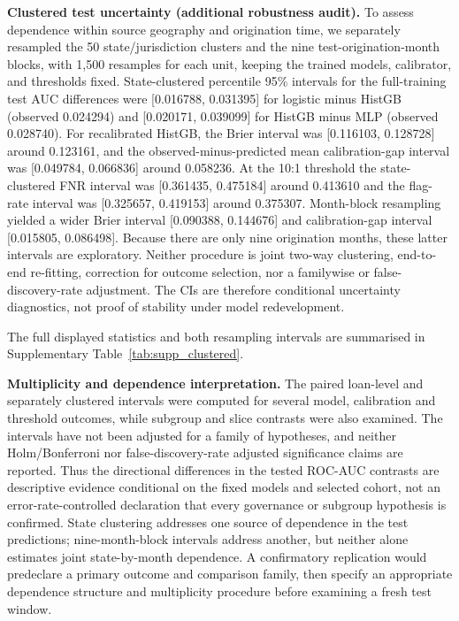 \documentclass[10pt]{article}
\begin{document}
\noindent\textbf{Clustered test uncertainty (additional robustness audit).} To assess dependence within source geography and origination time, we separately resampled the 50 state/jurisdiction clusters and the nine test-origination-month blocks, with 1,500 resamples for each unit, keeping the trained models, calibrator, and thresholds fixed. State-clustered percentile 95\% intervals for the full-training test AUC differences were [0.016788, 0.031395] for logistic minus HistGB (observed 0.024294) and [0.020171, 0.039099] for HistGB minus MLP (observed 0.028740). For recalibrated HistGB, the Brier interval was [0.116103, 0.128728] around 0.123161, and the observed-minus-predicted mean calibration-gap interval was [0.049784, 0.066836] around 0.058236. At the 10:1 threshold the state-clustered FNR interval was [0.361435, 0.475184] around 0.413610 and the flag-rate interval was [0.325657, 0.419153] around 0.375307. Month-block resampling yielded a wider Brier interval [0.090388, 0.144676] and calibration-gap interval [0.015805, 0.086498]. Because there are only nine origination months, these latter intervals are exploratory. Neither procedure is joint two-way clustering, end-to-end re-fitting, correction for outcome selection, nor a familywise or false-discovery-rate adjustment. The CIs are therefore conditional uncertainty diagnostics, not proof of stability under model redevelopment.

The full displayed statistics and both resampling intervals are summarised in Supplementary Table~\ref{tab:supp_clustered}.

\noindent\textbf{Multiplicity and dependence interpretation.} The paired loan-level and separately clustered intervals were computed for several model, calibration and threshold outcomes, while subgroup and slice contrasts were also examined. The intervals have not been adjusted for a family of hypotheses, and neither Holm/Bonferroni nor false-discovery-rate adjusted significance claims are reported. Thus the directional differences in the tested ROC-AUC contrasts are descriptive evidence conditional on the fixed models and selected cohort, not an error-rate-controlled declaration that every governance or subgroup hypothesis is confirmed. State clustering addresses one source of dependence in the test predictions; nine-month-block intervals address another, but neither alone estimates joint state-by-month dependence. A confirmatory replication would predeclare a primary outcome and comparison family, then specify an appropriate dependence structure and multiplicity procedure before examining a fresh test window.
\end{document}

